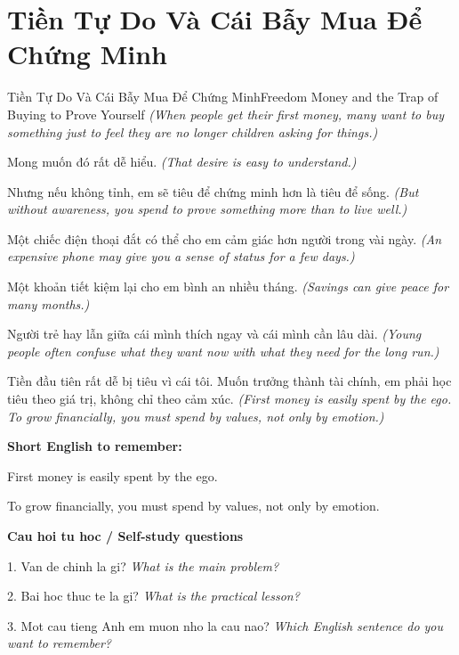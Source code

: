 \section{Tiền Tự Do Và Cái Bẫy Mua Để Chứng Minh}
\begin{truyen}{Tiền Tự Do Và Cái Bẫy Mua Để Chứng Minh}{Freedom Money and the Trap of Buying to Prove Yourself}
\textit{(When people get their first money, many want to buy something just to feel they are no longer children asking for things.)}

Mong muốn đó rất dễ hiểu.
\textit{(That desire is easy to understand.)}

Nhưng nếu không tỉnh, em sẽ tiêu để chứng minh hơn là tiêu để sống.
\textit{(But without awareness, you spend to prove something more than to live well.)}

Một chiếc điện thoại đắt có thể cho em cảm giác hơn người trong vài ngày.
\textit{(An expensive phone may give you a sense of status for a few days.)}

Một khoản tiết kiệm lại cho em bình an nhiều tháng.
\textit{(Savings can give peace for many months.)}

Người trẻ hay lẫn giữa cái mình thích ngay và cái mình cần lâu dài.
\textit{(Young people often confuse what they want now with what they need for the long run.)}

\end{truyen}

\begin{baihoc}
Tiền đầu tiên rất dễ bị tiêu vì cái tôi. Muốn trưởng thành tài chính, em phải học tiêu theo giá trị, không chỉ theo cảm xúc.
\textit{(First money is easily spent by the ego. To grow financially, you must spend by values, not only by emotion.)}
\end{baihoc}

\begin{ghinhoanh}
\textbf{Short English to remember:}

First money is easily spent by the ego.

To grow financially, you must spend by values, not only by emotion.

\end{ghinhoanh}

\begin{tuhocnhanh}
\textbf{Cau hoi tu hoc / Self-study questions}

1. Van de chinh la gi? \textit{What is the main problem?}

2. Bai hoc thuc te la gi? \textit{What is the practical lesson?}

3. Mot cau tieng Anh em muon nho la cau nao? \textit{Which English sentence do you want to remember?}
\end{tuhocnhanh}
\ngancach

